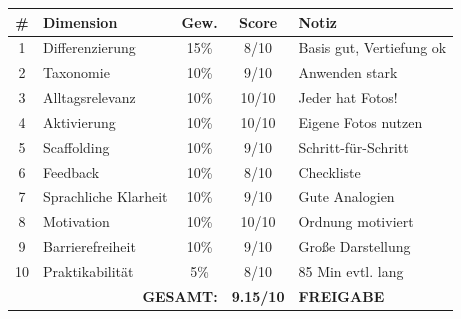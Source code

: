 \documentclass[11pt,a4paper]{article}
\begin{document}
\begin{scorebox}
\begin{tabular}{|c|l|c|c|p{3.5cm}|}
\hline
\# & Dimension & Gew. & Score & Notiz \\
\hline
1 & Differenzierung & 15\% & 8/10 & Basis gut, Vertiefung ok \\
2 & Taxonomie & 10\% & 9/10 & Anwenden stark \\
3 & Alltagsrelevanz & 10\% & 10/10 & Jeder hat Fotos! \\
4 & Aktivierung & 10\% & 10/10 & Eigene Fotos nutzen \\
5 & Scaffolding & 10\% & 9/10 & Schritt-für-Schritt \\
6 & Feedback & 10\% & 8/10 & Checkliste \\
7 & Sprachliche Klarheit & 10\% & 9/10 & Gute Analogien \\
8 & Motivation & 10\% & 10/10 & Ordnung motiviert \\
9 & Barrierefreiheit & 10\% & 9/10 & Große Darstellung \\
10 & Praktikabilität & 5\% & 8/10 & 85 Min evtl. lang \\
\hline
\multicolumn{3}{|r|}{\textbf{GESAMT:}} & \textbf{9.15/10} & \textcolor{successgreen}{\textbf{FREIGABE}} \\
\hline
\end{tabular}
\end{scorebox}
\end{document}

